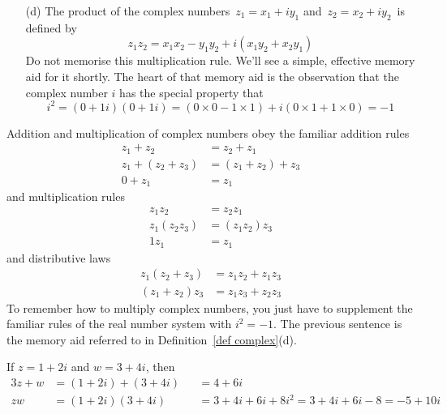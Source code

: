 \addtocounter{theorem}{-1}
\begin{defn}[continued]
\begin{enumerate}[(a)]
\item[(d)]
The product of the complex numbers $\, z_1=x_1+i y_1 $ and
$\, z_2=x_2 +iy_2 \, $ is defined by
\begin{equation*}
z_1z_2 = x_1x_2-y_1y_2+i(x_1y_2+x_2y_1)
\end{equation*}
Do not memorise this multiplication rule. We'll see a simple, effective memory aid for it shortly.
The heart of that memory aid is the observation that the complex number $i$ has the special property that
\begin{equation*}
i^2 = (0+1i)(0+1i) = (0\times 0-1\times 1)+i(0\times 1+1\times 0) = -1
\end{equation*}
\end{enumerate}
\end{defn}
Addition and multiplication of complex numbers obey the familiar addition rules
\begin{align*}
z_1+z_2&=z_2+z_1  \\
z_1+(z_2+z_3)&=(z_1+z_2)+z_3 \\
0+z_1&=z_1 
\end{align*}
and multiplication rules
\begin{align*}
z_1z_2&=z_2z_1 \\
z_1(z_2z_3)&=(z_1z_2)z_3 \\
1z_1&=z_1 
\end{align*}
and distributive laws
\begin{align*}
z_1(z_2+z_3)&=z_1z_2+z_1z_3 \\
(z_1+z_2)z_3& = z_1z_3+z_2z_3 
\end{align*}
To remember how to multiply complex numbers, you just have to supplement
the familiar rules of the real number system with $i^2=-1$. The previous 
sentence is the memory aid referred to in  Definition~\ref{def complex}(d). 
\begin{eg}\label{eg add multiply}
If $z=1+2i$ and $w=3+4i$, then
\begin{alignat*}{3}
z+w&=(1+2i)+(3+4i)&&=4+6i \\
zw&=(1+2i)(3+4i)&&=3+4i+6i+8i^2=3+4i+6i-8=-5+10i
\end{alignat*}
\end{eg}
